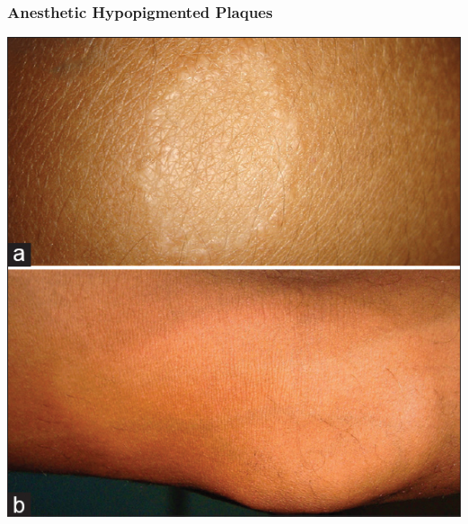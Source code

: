 \documentclass{beamer}
\begin{document}
	\begin{frame}
		\frametitle{Anesthetic Hypopigmented Plaques}
		\centering
		\includegraphics[height=0.8\textheight,keepaspectratio]{hypopigmented-plaques.jpg}
	\end{frame}
\end{document}
